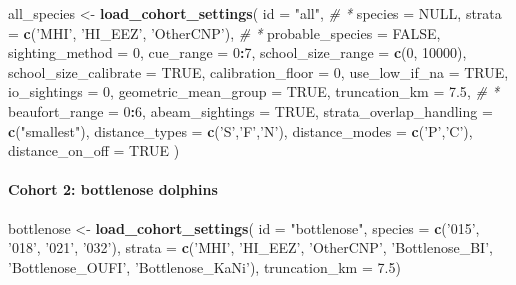 \documentclass[
]{book}
\newenvironment{Shaded}{\begin{snugshade}}{\end{snugshade}}
\newcommand{\CommentTok}[1]{\textcolor[rgb]{0.56,0.35,0.01}{\textit{#1}}}
\newcommand{\DataTypeTok}[1]{\textcolor[rgb]{0.13,0.29,0.53}{#1}}
\newcommand{\DecValTok}[1]{\textcolor[rgb]{0.00,0.00,0.81}{#1}}
\newcommand{\FloatTok}[1]{\textcolor[rgb]{0.00,0.00,0.81}{#1}}
\newcommand{\KeywordTok}[1]{\textcolor[rgb]{0.13,0.29,0.53}{\textbf{#1}}}
\newcommand{\NormalTok}[1]{#1}
\newcommand{\OperatorTok}[1]{\textcolor[rgb]{0.81,0.36,0.00}{\textbf{#1}}}
\newcommand{\OtherTok}[1]{\textcolor[rgb]{0.56,0.35,0.01}{#1}}
\newcommand{\StringTok}[1]{\textcolor[rgb]{0.31,0.60,0.02}{#1}}
\begin{document}
\begin{Shaded}
\begin{Highlighting}[]
\NormalTok{all_species <-}\StringTok{ }\KeywordTok{load_cohort_settings}\NormalTok{(}
  \DataTypeTok{id =} \StringTok{"all"}\NormalTok{, }\CommentTok{# *}
  \DataTypeTok{species =} \OtherTok{NULL}\NormalTok{, }
  \DataTypeTok{strata =} \KeywordTok{c}\NormalTok{(}\StringTok{'MHI'}\NormalTok{, }\StringTok{'HI_EEZ'}\NormalTok{, }\StringTok{'OtherCNP'}\NormalTok{), }\CommentTok{# *}
  \DataTypeTok{probable_species =} \OtherTok{FALSE}\NormalTok{,}
  \DataTypeTok{sighting_method =} \DecValTok{0}\NormalTok{,}
  \DataTypeTok{cue_range =} \DecValTok{0}\OperatorTok{:}\DecValTok{7}\NormalTok{,}
  \DataTypeTok{school_size_range =} \KeywordTok{c}\NormalTok{(}\DecValTok{0}\NormalTok{, }\DecValTok{10000}\NormalTok{),}
  \DataTypeTok{school_size_calibrate =} \OtherTok{TRUE}\NormalTok{,}
  \DataTypeTok{calibration_floor =} \DecValTok{0}\NormalTok{,}
  \DataTypeTok{use_low_if_na =} \OtherTok{TRUE}\NormalTok{,}
  \DataTypeTok{io_sightings =} \DecValTok{0}\NormalTok{,}
  \DataTypeTok{geometric_mean_group =} \OtherTok{TRUE}\NormalTok{,}
  \DataTypeTok{truncation_km =} \FloatTok{7.5}\NormalTok{, }\CommentTok{# *}
  \DataTypeTok{beaufort_range =} \DecValTok{0}\OperatorTok{:}\DecValTok{6}\NormalTok{,}
  \DataTypeTok{abeam_sightings =} \OtherTok{TRUE}\NormalTok{,}
  \DataTypeTok{strata_overlap_handling =} \KeywordTok{c}\NormalTok{(}\StringTok{"smallest"}\NormalTok{),}
  \DataTypeTok{distance_types =} \KeywordTok{c}\NormalTok{(}\StringTok{'S'}\NormalTok{,}\StringTok{'F'}\NormalTok{,}\StringTok{'N'}\NormalTok{),}
  \DataTypeTok{distance_modes =} \KeywordTok{c}\NormalTok{(}\StringTok{'P'}\NormalTok{,}\StringTok{'C'}\NormalTok{),}
  \DataTypeTok{distance_on_off =} \OtherTok{TRUE}
\NormalTok{)}
\end{Highlighting}
\end{Shaded}

\hypertarget{cohort-2-bottlenose-dolphins-1}{%
\paragraph{Cohort 2: bottlenose dolphins}\label{cohort-2-bottlenose-dolphins-1}}

\begin{Shaded}
\begin{Highlighting}[]
\NormalTok{bottlenose <-}\StringTok{ }\KeywordTok{load_cohort_settings}\NormalTok{(}
  \DataTypeTok{id =} \StringTok{"bottlenose"}\NormalTok{,}
  \DataTypeTok{species =} \KeywordTok{c}\NormalTok{(}\StringTok{'015'}\NormalTok{, }\StringTok{'018'}\NormalTok{, }\StringTok{'021'}\NormalTok{, }\StringTok{'032'}\NormalTok{),}
  \DataTypeTok{strata =} \KeywordTok{c}\NormalTok{(}\StringTok{'MHI'}\NormalTok{, }\StringTok{'HI_EEZ'}\NormalTok{, }\StringTok{'OtherCNP'}\NormalTok{,}
             \StringTok{'Bottlenose_BI'}\NormalTok{, }\StringTok{'Bottlenose_OUFI'}\NormalTok{, }\StringTok{'Bottlenose_KaNi'}\NormalTok{),}
  \DataTypeTok{truncation_km =} \FloatTok{7.5}\NormalTok{)}
\end{Highlighting}
\end{Shaded}
\end{document}
